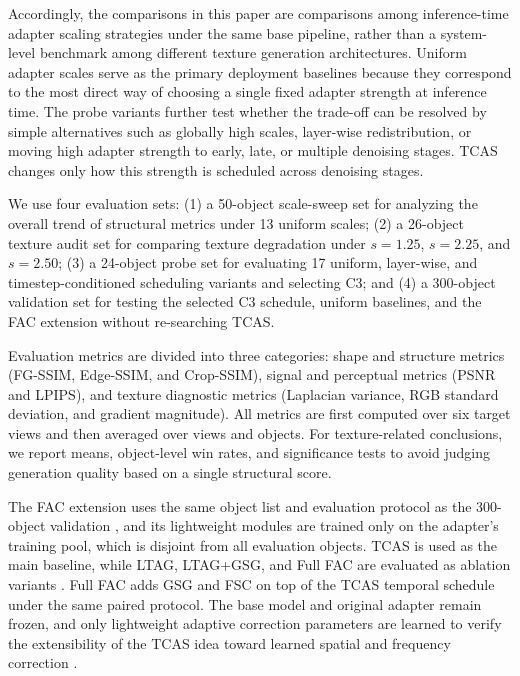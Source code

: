 \documentclass[times,twocolumn,final]{elsarticle}
\providecommand{\DIFadd}[1]{{\protect\color{red} \sf #1}} %
\providecommand{\DIFdel}[1]{{\protect\color{red} \scriptsize #1}} %
\providecommand{\DIFaddbegin}{} %
\providecommand{\DIFaddend}{} %
\providecommand{\DIFdelbegin}{} %
\providecommand{\DIFdelend}{} %
\newcommand{\DIFscaledelfig}{0.5}
\newlength{\DIFdelgraphicswidth} %
\newlength{\DIFdelgraphicsheight} %
\newcommand{\DIFaddincludegraphics}[2][]{{\color{red}\fbox{\DIFOincludegraphics[#1]{#2}}}} %
\newcommand{\DIFdelincludegraphics}[2][]{%
\sbox{\DIFdelgraphicsbox}{\DIFOincludegraphics[#1]{#2}}%
\settoboxwidth{\DIFdelgraphicswidth}{\DIFdelgraphicsbox} %
\settoboxtotalheight{\DIFdelgraphicsheight}{\DIFdelgraphicsbox} %
\scalebox{\DIFscaledelfig}{%
\parbox[b]{\DIFdelgraphicswidth}{\usebox{\DIFdelgraphicsbox}\\[-\baselineskip] \rule{\DIFdelgraphicswidth}{0em}}\llap{\resizebox{\DIFdelgraphicswidth}{\DIFdelgraphicsheight}{%
\setlength{\unitlength}{\DIFdelgraphicswidth}%
\begin{picture}(1,1)%
\thicklines\linethickness{2pt} %
{\color[rgb]{1,0,0}\put(0,0){\framebox(1,1){}}}%
{\color[rgb]{1,0,0}\put(0,0){\line( 1,1){1}}}%
{\color[rgb]{1,0,0}\put(0,1){\line(1,-1){1}}}%
\end{picture}%
}\hspace*{3pt}}} %
} %
\DeclareRobustCommand{\DIFaddbegin}{\DIFOaddbegin \let\includegraphics\DIFaddincludegraphics} %
\DeclareRobustCommand{\DIFaddend}{\DIFOaddend \let\includegraphics\DIFOincludegraphics} %
\DeclareRobustCommand{\DIFdelbegin}{\DIFOdelbegin \let\includegraphics\DIFdelincludegraphics} %
\DeclareRobustCommand{\DIFdelend}{\DIFOaddend \let\includegraphics\DIFOincludegraphics} %
\begin{document}
Accordingly, the comparisons in this paper are comparisons among inference-time adapter scaling strategies under the same base pipeline, rather than a system-level benchmark among different texture generation architectures. Uniform adapter scales serve as the primary deployment baselines because they correspond to the most direct way of choosing a single fixed adapter strength at inference time. The probe variants further test whether the trade-off can be resolved by simple alternatives such as globally high scales, layer-wise redistribution, or moving high adapter strength to early, late, or multiple denoising stages. TCAS changes only how this strength is scheduled across denoising stages.

We use four evaluation sets: (1) a 50-object scale-sweep set for analyzing the overall trend of structural metrics under 13 uniform scales; (2) a 26-object texture audit set for comparing texture degradation under $s = 1.25$, $s = 2.25$, and $s = 2.50$; (3) a 24-object probe set for evaluating 17 uniform, layer-wise, and timestep-conditioned scheduling variants and selecting C3; and (4) a 300-object validation set for testing the selected C3 schedule, uniform baselines, and the FAC extension without re-searching TCAS.

Evaluation metrics are divided into three categories: shape and structure metrics (FG-SSIM, Edge-SSIM, and Crop-SSIM), signal and perceptual metrics (PSNR and LPIPS), and texture diagnostic metrics (Laplacian variance, RGB standard deviation, and gradient magnitude). All metrics are first computed over six target views and then averaged over views and objects. For texture-related conclusions, we report means, object-level win rates, and significance tests to avoid judging generation quality based on a single structural score.

The FAC extension uses the same object list and evaluation protocol as the 300-object validation\DIFaddbegin \DIFadd{, and its lightweight modules are trained only on the adapter's training pool, which is disjoint from all evaluation objects}\DIFaddend . TCAS is used as the main baseline, while LTAG, LTAG+GSG, and Full FAC are evaluated as ablation variants \DIFdelbegin \DIFdel{. Full FAC adds GSG and FSC on top of the TCAS temporal schedule}\DIFdelend \DIFaddbegin \DIFadd{under the same paired protocol}\DIFaddend . The base model and original adapter remain frozen, and only lightweight adaptive correction parameters are learned\DIFdelbegin \DIFdel{to verify the extensibility of the TCAS idea toward learned spatial and frequency correction}\DIFdelend \DIFaddbegin \DIFadd{.
}
\end{document}

